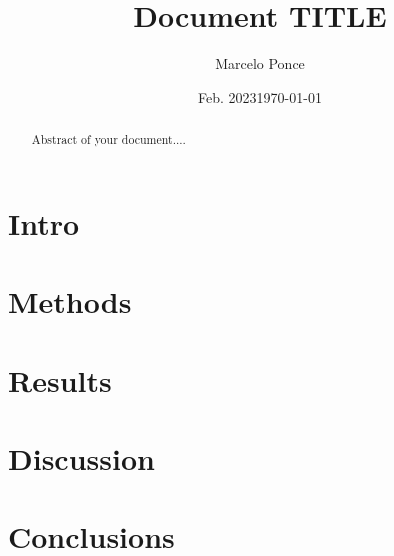 \documentclass[notitlepage,nofootinbib]{revtex4-1}
\begin{document}


\title{Document TITLE}

\author{Marcelo Ponce}

\date{Feb. 2023}
\date{\today}


\begin{abstract}
Abstract of your document....
\end{abstract}


\maketitle



\section{Intro}


\section{Methods}


\section{Results}


\section{Discussion}


\section{Conclusions}


\end{document}
